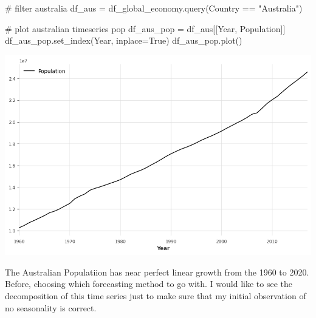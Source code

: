 \documentclass[
  11pt,
]{article}
\newenvironment{Shaded}{\begin{snugshade}}{\end{snugshade}}
\newcommand{\CommentTok}[1]{\textcolor[rgb]{0.37,0.37,0.37}{#1}}
\newcommand{\NormalTok}[1]{\textcolor[rgb]{0.00,0.23,0.31}{#1}}
\newcommand{\OperatorTok}[1]{\textcolor[rgb]{0.37,0.37,0.37}{#1}}
\newcommand{\StringTok}[1]{\textcolor[rgb]{0.13,0.47,0.30}{#1}}
\newcommand{\VariableTok}[1]{\textcolor[rgb]{0.07,0.07,0.07}{#1}}
\begin{document}
\begin{Shaded}
\begin{Highlighting}[]
\CommentTok{\# filter australia}
\NormalTok{df\_aus }\OperatorTok{=}\NormalTok{ df\_global\_economy.query(}\StringTok{\textquotesingle{}Country == "Australia"\textquotesingle{}}\NormalTok{)}
\end{Highlighting}
\end{Shaded}

\begin{Shaded}
\begin{Highlighting}[]
\CommentTok{\# plot australian timeseries pop}
\NormalTok{df\_aus\_pop }\OperatorTok{=}\NormalTok{ df\_aus[[}\StringTok{\textquotesingle{}Year\textquotesingle{}}\NormalTok{, }\StringTok{\textquotesingle{}Population\textquotesingle{}}\NormalTok{]]}
\NormalTok{df\_aus\_pop.set\_index(}\StringTok{\textquotesingle{}Year\textquotesingle{}}\NormalTok{, inplace}\OperatorTok{=}\VariableTok{True}\NormalTok{)}
\NormalTok{df\_aus\_pop.plot()}
\end{Highlighting}
\end{Shaded}

\includegraphics{hw3_files/figure-pdf/cell-6-output-1.png}

The Australian Populatiion has near perfect linear growth from the 1960
to 2020. Before, choosing which forecasting method to go with. I would
like to see the decomposition of this time series just to make sure that
my initial observation of no seasonality is correct.
\end{document}
